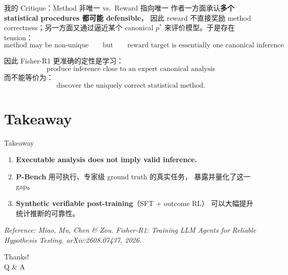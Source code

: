 \documentclass[aspectratio=169]{ctexbeamer}
\begin{document}
\begin{frame}{我的 Critique：Method 非唯一 vs.\ Reward 指向唯一}
  作者一方面承认\textbf{多个 statistical procedures 都可能 defensible}，
  因此 reward 不直接奖励 method correctness；另一方面又通过逼近某个
  canonical $p^{*}$ 来评价模型。于是存在 tension：
  \[
    \boxed{\text{method may be non-unique}}
    \qquad\text{but}\qquad
    \boxed{\text{reward target is essentially one canonical inference}}
  \]

  \medskip
  因此 Fisher-R1 更准确的定性是学习：
  \[
    \text{produce inference close to an expert canonical analysis}
  \]
  而不能等价为：
  \[
    \text{discover the uniquely correct statistical method.}
  \]
\end{frame}

\section{Takeaway}

\begin{frame}{Takeaway}
  \begin{enumerate}
    \setlength{\itemsep}{12pt}
    \item \textbf{Executable analysis does not imply valid inference.}
    \item \textbf{P-Bench} 用可执行、专家级 ground truth 的真实任务，
          暴露并量化了这一 gap。
    \item \textbf{Synthetic verifiable post-training}（SFT + outcome RL）
          可以大幅提升统计推断的可靠性。
    \end{enumerate}

  \medskip
  \textit{Reference: Miao, Mu, Chen \& Zou.
  Fisher-R1: Training LLM Agents for Reliable Hypothesis Testing.
  arXiv:2608.07437, 2026.}
\end{frame}

\begin{frame}
  \begin{center}
    \Huge Thanks!\\[12pt]
    \Large Q \& A
  \end{center}
\end{frame}
\end{document}
